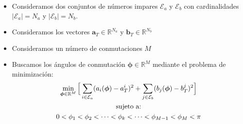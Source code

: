 
\begin{frame}
    \frametitle{}
    \begin{problem}
        \begin{itemize}
            \item Consideramos dos conjuntos de números impares $\mathcal{E}_a$ y $\mathcal{E}_b$ con cardinalidades $|\mathcal{E}_a| = N_a$ y  $|\mathcal{E}_b| = N_b$.
            \item Consideramos los vectores $\bm{a}_T  \in \mathbb{R}^{N_a}$ y $\bm{b}_T  \in \mathbb{R}^{N_b}$
            \item Consideramos un número de conmutaciones $M$
            \item Buscamos los ángulos de conmutación $\bm{\phi} \in \mathbb{R}^M$ mediante el problema de minimización:
        \begin{gather}
            \min_{\bm{\phi} \in \mathbb{R}^M} \Big[
            \sum_{i \in \mathcal{E}_a} (a_i(\bm{\phi}) - a^i_T)^2 + 
            \sum_{j \in \mathcal{E}_b} (b_j(\bm{\phi}) - b^j_T)^2  
            \Big] \\
            \notag \text{sujeto a:} \\ 
            \notag    0 < \phi_1  < \phi_2 < \dots  < \phi_k < \dots < \phi_{M-1}  <   \phi_{M} < \pi
            \label{constraints}
        \end{gather} 
    \end{itemize}
\end{problem}

\end{frame}


